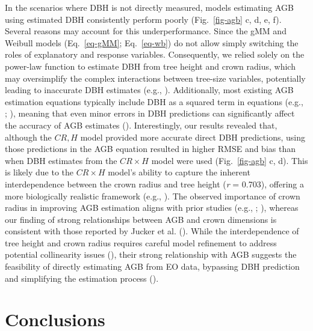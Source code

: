 \documentclass[
  12pt,
  letterpaper,
  DIV=11,
  numbers=noendperiod]{scrartcl}
\begin{document}
In the scenarios where DBH is not directly measured, models estimating
AGB using estimated DBH consistently perform poorly (Fig.~\ref{fig-agb}
c, d, e, f). Several reasons may account for this underperformance.
Since the gMM and Weibull models (Eq.~\ref{eq-gMM}; Eq.~\ref{eq-wb}) do
not allow simply switching the roles of explanatory and response
variables. Consequently, we relied solely on the power-law function to
estimate DBH from tree height and crown radius, which may oversimplify
the complex interactions between tree-size variables, potentially
leading to inaccurate DBH estimates (e.g.,
). Additionally, most
existing AGB estimation equations typically include DBH as a squared
term in equations (e.g., ;
), meaning that even minor
errors in DBH predictions can significantly affect the accuracy of AGB
estimates ().
Interestingly, our results revealed that, although the \(CR,H\) model
provided more accurate direct DBH predictions, using those predictions
in the AGB equation resulted in higher RMSE and bias than when DBH
estimates from the \(CR \times H\) model were used (Fig.~\ref{fig-agb}
c, d). This is likely due to the \(CR \times H\) model's ability to
capture the inherent interdependence between the crown radius and tree
height (\emph{r} = 0.703), offering a more biologically realistic
framework (e.g., ). The
observed importance of crown radius in improving AGB estimation aligns
with prior studies (e.g., ;
), whereas our finding of
strong relationships between AGB and crown dimensions is consistent with
those reported by Jucker et al. (). While
the interdependence of tree height and crown radius requires careful
model refinement to address potential collinearity issues
(), their strong
relationship with AGB suggests the feasibility of directly estimating
AGB from EO data, bypassing DBH prediction and simplifying the
estimation process ().

\section{Conclusions}\label{conclusions}
\end{document}
